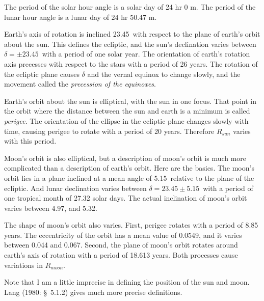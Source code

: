 The period of the solar hour angle is a solar day of 24 hr 0 m. The period of the
lunar hour angle is a lunar day of 24 hr 50.47 m.

Earth's axis of rotation is inclined 23.45\degrees\ with respect to the plane of earth's orbit
about the sun. This defines the ecliptic, and the sun's declination varies between $\delta =
\pm 23.45$\degrees\ with a period of one solar year. The orientation of earth's rotation axis
precesses with respect to the stars with a period of 26 years. The rotation of
the ecliptic plane causes $\delta$ and the vernal equinox to change slowly, and the movement
called the \textit{precession of the equinoxes}.

Earth's orbit about the sun is elliptical, with the sun in one focus. That point in the orbit
where the distance between the sun and earth is a minimum is called \textit{perigee}.
    The orientation of the ellipse in
the ecliptic plane changes slowly with time, causing perigee to rotate with a period of
20 years. Therefore $R_{sun}$ varies with this period.

Moon's orbit is also elliptical, but a description of moon's orbit is much
more complicated than a description of earth's orbit. Here are the basics. The
moon's orbit lies in a plane inclined at a mean angle of 5.15\degrees\ relative to
the plane of the ecliptic. And lunar declination varies between $\delta = 23.45 \pm
5.15$\degrees\ with a period of one tropical month of 27.32 solar days. The
actual inclination of moon's orbit varies between 4.97\degrees, and
5.32\degrees.

The shape of moon's orbit also varies. First, perigee rotates with a period of
8.85 years. The eccentricity of the orbit has a mean value of 0.0549, and it varies
between 0.044 and 0.067. Second, the plane of moon's orbit rotates around earth's
axis of rotation with a period of 18.613 years. Both processes cause variations in
$R_{moon}$.

Note that I am a little imprecise in defining the position of the sun and moon.
Lang (1980: \S \ 5.1.2) gives much more precise definitions.

